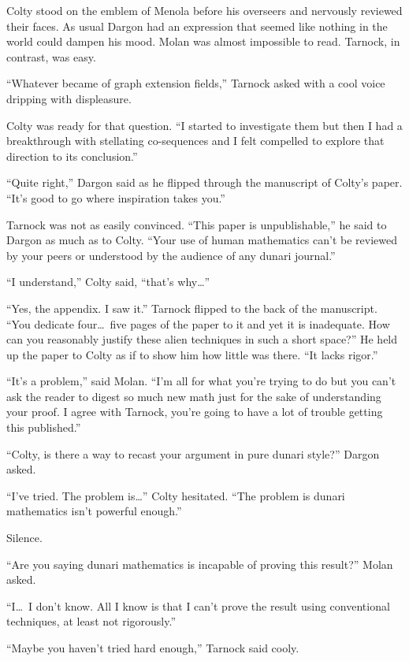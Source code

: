 
Colty stood on the emblem of Menola before his overseers and nervously reviewed their faces. As
usual Dargon had an expression that seemed like nothing in the world could dampen his mood.
Molan was almost impossible to read. Tarnock, in contrast, was easy.

``Whatever became of graph extension fields,'' Tarnock asked with a cool voice dripping with
displeasure.

Colty was ready for that question. ``I started to investigate them but then I had a breakthrough
with stellating co-sequences and I felt compelled to explore that direction to its conclusion.''

``Quite right,'' Dargon said as he flipped through the manuscript of Colty's paper. ``It's good
to go where inspiration takes you.''

Tarnock was not as easily convinced. ``This paper is unpublishable,'' he said to Dargon as much
as to Colty. ``Your use of human mathematics can't be reviewed by your peers or understood by
the audience of any dunari journal.''

``I understand,'' Colty said, ``that's why\ldots''

``Yes, the appendix. I saw it.'' Tarnock flipped to the back of the manuscript. ``You dedicate
four\ldots\ five pages of the paper to it and yet it is inadequate. How can you reasonably
justify these alien techniques in such a short space?'' He held up the paper to Colty as if to
show him how little was there. ``It lacks rigor.''

``It's a problem,'' said Molan. ``I'm all for what you're trying to do but you can't ask the
reader to digest so much new math just for the sake of understanding your proof. I agree with
Tarnock, you're going to have a lot of trouble getting this published.''

``Colty, is there a way to recast your argument in pure dunari style?'' Dargon asked.

``I've tried. The problem is\ldots'' Colty hesitated. ``The problem is dunari mathematics isn't
powerful enough.''

Silence.

``Are you saying dunari mathematics is incapable of proving this result?'' Molan asked.

``I\ldots\ I don't know. All I know is that I can't prove the result using conventional
techniques, at least not rigorously.''

``Maybe you haven't tried hard enough,'' Tarnock said cooly.

